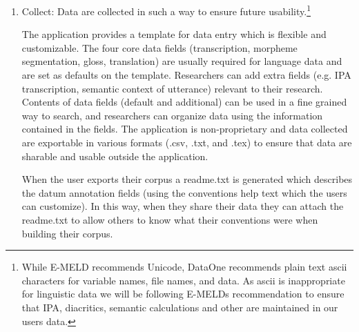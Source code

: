 \documentclass[12 pt]{article}
\begin{document}
\begin{enumerate}
Data sharing: Data may be shared with members outside of the iField app via embedding live widgets on their department or lab webpages, or WordPress blogs. Data may also be expiated as LaTeX source code to be given directly to members of their data collection team who are not using the iField app. Users can schedule "Bots" to automatically release/publish their data to external web services  or language archives.

Data preservation: Data are stored locally on the users' machines if they use an Android or a Chrome App. The data is also stored on a central server of their choosing, either a server hosted in the cloud, or a department server. 

Budget: The iField app is free and OpenSouce, it can be installed for free on department servers, or institutional data centres, which may require hiring professionals to maintain the database and ensure that the data is properly backed up. The iField app can also run on the cloud and departments can choose to host their data on a cloud hosting provider. The costs usually range between \$1 and \$10 per month for 1-100 gigabytes of data/data transfer.


\item Collect: Data are collected in such a way to ensure future usability.\footnote{While E-MELD recommends Unicode, DataOne recommends plain text ascii characters for variable names, file names, and data. As ascii is inappropriate for linguistic data we will be following E-MELDs recommendation to ensure that IPA, diacritics, semantic calculations and other are maintained in our users data.}


The application provides a template for data entry which is flexible and customizable. The four core data fields (transcription, morpheme segmentation, gloss, translation) are usually required for language data and are set as defaults on the template. Researchers can add extra fields (e.g. IPA transcription, semantic context of utterance) relevant to their research. Contents of data fields (default and additional) can be used in a fine grained way  to search, and researchers can organize data using the information contained in the fields. 
The application is non-proprietary and data collected are exportable in various formats (.csv, .txt, and .tex) to ensure that data are sharable and usable outside the application. 

When the user exports their corpus a readme.txt is generated which describes the datum annotation fields (using the conventions help text which the users can customize). In this way, when they share their data they can attach the readme.txt to allow others to know what their conventions were when building their corpus. 




\end{enumerate}
\end{document}
